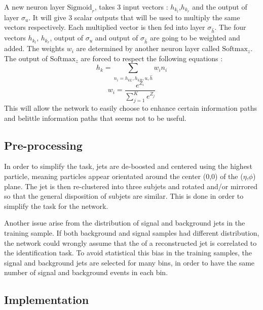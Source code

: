 A new neuron layer $\mathrm{Sigmoid}_r$, takes 3 input vectors : $h_k_l$,$h_k_r$ and the output of layer $\sigma_u$. It will give 3 scalar outputs that will be used to multiply the same vectors respectively. Each multiplied vector is then fed into layer $\sigma_\hat{h}$. 
The four vectors $h_k_l$, $h_k_r$, output of $\sigma_u$ and output of $\sigma_\hat{h}$ are going to be weighted and added. The weights $w_i$ are determined by another neuron layer called $\mathrm{Softmax}_z$. The output of $\mathrm{Softmax}_z$ are forced to respect the following equations :
\begin{equation}    
    h_{k} = \sum_{n_{i}=h_{kL},h_{kR},u,\hat{h}} w_{i}n_{i}
\end{equation}
\begin{equation}
    w_{i} = \frac{e^{Z_i}}{\sum_{j=1}^{K}e^{Z_j}}
\end{equation}
This will allow the network to easily choose to enhance certain information paths and belittle information paths that seems not to be useful.

\subsection{Pre-processing}

In order to simplify the task, jets are de-boosted and centered using the highest \pt particle, meaning particles appear orientated around the center (0,0) of the ($\eta$,$\phi$) plane. The jet is then re-clustered into three subjets and rotated and/or mirrored so that the general disposition of subjets are similar. This is done in order to simplify the task for the network.

Another issue arise from the distribution of signal and background jets in the training sample. If both background and signal samples had different \pt distribution, the network could wrongly assume that the \pt of a reconstructed jet is correlated to the identification task. To avoid statistical this bias in the training samples, the signal and background jets are selected for many \pt bins, in order to have the same number of signal and background events in each bin.

\subsection{Implementation}

